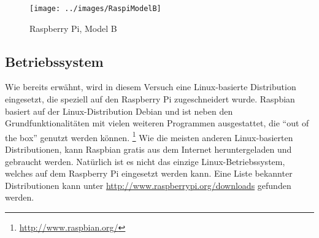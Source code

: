 \begin{figure}[h]
  \centering
  \texttt{[image: ../images/RaspiModelB]}
  \caption{Raspberry Pi, Model B}
\end{figure}

\subsection{Betriebssystem}
Wie bereits erwähnt, wird in diesem Versuch eine Linux-basierte Distribution eingesetzt, die speziell auf den Raspberry Pi zugeschneidert wurde. Raspbian basiert auf der Linux-Distribution Debian und ist neben den Grundfunktionalitäten mit vielen weiteren Programmen ausgestattet, die ``out of the box'' genutzt werden können.
\footnote{\url{http://www.raspbian.org/}}
Wie die meisten anderen Linux-basierten Distributionen, kann Raspbian gratis aus dem Internet heruntergeladen und gebraucht werden. Natürlich ist es nicht das einzige Linux-Betriebssystem, welches auf dem Raspberry Pi eingesetzt werden kann. Eine Liste bekannter Distributionen kann unter \url{http://www.raspberrypi.org/downloads} gefunden werden.
